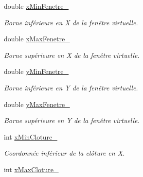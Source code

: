 \begin{DoxyCompactItemize}
\item 
\hypertarget{classvue_1_1_projection_a67e61c694751592d959c5afe546c1cb3}{double \hyperlink{classvue_1_1_projection_a67e61c694751592d959c5afe546c1cb3}{x\-Min\-Fenetre\-\_\-}}\label{classvue_1_1_projection_a67e61c694751592d959c5afe546c1cb3}

\begin{DoxyCompactList}\small\item\em Borne inférieure en X de la fenêtre virtuelle. \end{DoxyCompactList}\item 
\hypertarget{classvue_1_1_projection_a6bd4ea5a8051ed28758ecee22112830e}{double \hyperlink{classvue_1_1_projection_a6bd4ea5a8051ed28758ecee22112830e}{x\-Max\-Fenetre\-\_\-}}\label{classvue_1_1_projection_a6bd4ea5a8051ed28758ecee22112830e}

\begin{DoxyCompactList}\small\item\em Borne supérieure en X de la fenêtre virtuelle. \end{DoxyCompactList}\item 
\hypertarget{classvue_1_1_projection_a6aa15731ceb459d6571269a7a4b22523}{double \hyperlink{classvue_1_1_projection_a6aa15731ceb459d6571269a7a4b22523}{y\-Min\-Fenetre\-\_\-}}\label{classvue_1_1_projection_a6aa15731ceb459d6571269a7a4b22523}

\begin{DoxyCompactList}\small\item\em Borne inférieure en Y de la fenêtre virtuelle. \end{DoxyCompactList}\item 
\hypertarget{classvue_1_1_projection_a6e8989a721be1cf825a59d98326960d9}{double \hyperlink{classvue_1_1_projection_a6e8989a721be1cf825a59d98326960d9}{y\-Max\-Fenetre\-\_\-}}\label{classvue_1_1_projection_a6e8989a721be1cf825a59d98326960d9}

\begin{DoxyCompactList}\small\item\em Borne supérieure en Y de la fenêtre virtuelle. \end{DoxyCompactList}\item 
\hypertarget{classvue_1_1_projection_ab72f1930aa81faf98b2a9cb60f54af33}{int \hyperlink{classvue_1_1_projection_ab72f1930aa81faf98b2a9cb60f54af33}{x\-Min\-Cloture\-\_\-}}\label{classvue_1_1_projection_ab72f1930aa81faf98b2a9cb60f54af33}

\begin{DoxyCompactList}\small\item\em Coordonnée inférieur de la clôture en X. \end{DoxyCompactList}\item 
\hypertarget{classvue_1_1_projection_abaed989322960f44c619b5a22e51dc22}{int \hyperlink{classvue_1_1_projection_abaed989322960f44c619b5a22e51dc22}{x\-Max\-Cloture\-\_\-}}\label{classvue_1_1_projection_abaed989322960f44c619b5a22e51dc22}


\end{DoxyCompactItemize}
